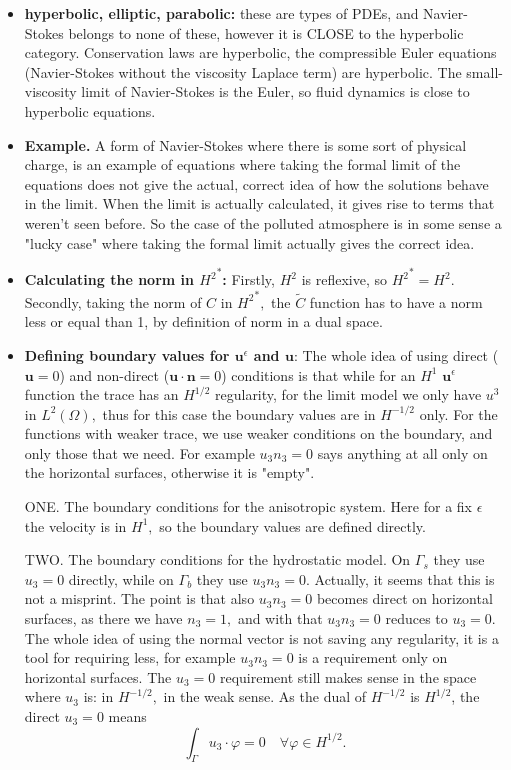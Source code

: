 \documentclass[11pt]{article}
\begin{document}
\begin{itemize}
\item \textbf{hyperbolic, elliptic, parabolic:} these are types of PDEs, and Navier-Stokes belongs to none of these, however it is CLOSE to the hyperbolic category. Conservation laws are hyperbolic, the compressible Euler equations (Navier-Stokes without the viscosity Laplace term) are hyperbolic. The small-viscosity limit of Navier-Stokes is the Euler, so fluid dynamics is close to hyperbolic equations.

\item \textbf{Example.} A form of Navier-Stokes where there is some sort of physical charge, is an example of equations where taking the formal limit of the equations does not give the actual, correct idea of how the solutions behave in the limit. When the limit is actually calculated, it gives rise to terms that weren't seen before. So the case of the polluted atmosphere is in some sense a "lucky case" where taking the formal limit actually gives the correct idea.

\item \textbf{Calculating the norm in ${H^2}^*$:} Firstly, $H^2$ is reflexive, so ${H^2}^* = H^2.$ Secondly, taking the norm of $C$ in ${H^2}^*,$ the $\tilde{C}$ function has to have a norm less or equal than 1, by definition of norm in a dual space.

\item \textbf{Defining boundary values for $\mathbf{u}^\epsilon$ and $\mathbf{u}$}: The whole idea of using direct ($\mathbf{u} = 0 $) and non-direct ($\mathbf{u} \cdot \mathbf{n} = 0 $) conditions is that while for an $H^1$ $\mathbf{u}^\epsilon$ function the trace has an $H^{1/2}$ regularity, for the limit model we only have $u^3$ in $L^2(\Omega),$ thus for this case the boundary values are in $H^{-1/2}$ only. For the functions with weaker trace, we use weaker conditions on the boundary, and only those that we need. For example $u_3 n_3 = 0$ says anything at all only on the horizontal surfaces, otherwise it is "empty".

ONE. The boundary conditions for the anisotropic system. Here for a fix $\epsilon$ the velocity is in $H^1,$ so the boundary values are defined directly.

TWO. The boundary conditions for the hydrostatic model. On $\Gamma_s$ they use $u_3 = 0$ directly, while on $\Gamma_b$ they use $u_3 n_3 = 0.$ Actually, it seems that this is not a misprint. The point is that also $u_3 n_3 = 0$ becomes direct on horizontal surfaces, as there we have $n_3 = 1,$ and with that $u_3 n_3 = 0$ reduces to $u_3 = 0.$ The whole idea of using the normal vector is not saving any regularity, it is a tool for requiring less, for example $u_3 n_3 = 0$ is a requirement only on horizontal surfaces. The $u_3 = 0$ requirement still makes sense in the space where $u_3$ is: in $H^{-1/2},$ in the weak sense. As the dual of $H^{-1/2}$ is $H^{1/2}$, the direct $u_3 = 0$ means $$ \int_\Gamma u_3 \cdot \varphi = 0 \quad \forall \varphi \in H^{1/2}.$$


\end{itemize}
\end{document}
